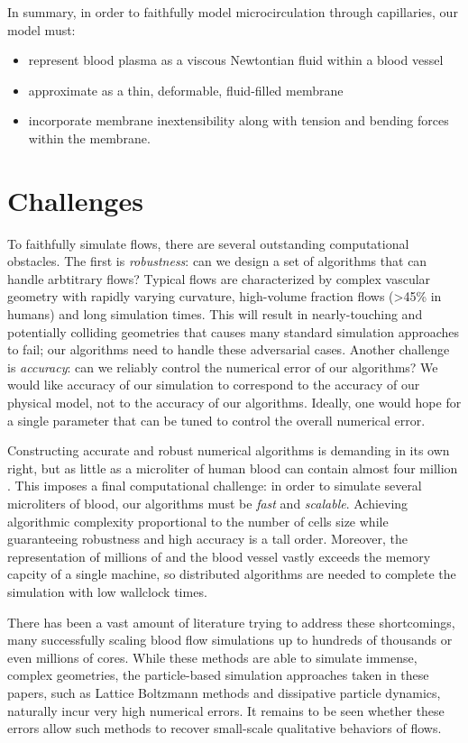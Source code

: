 In summary, in order to faithfully model microcirculation through capillaries, our model must:
\begin{itemize}
    \item represent blood plasma as a viscous Newtontian fluid within a blood vessel
    \item approximate \rbcs as a thin, deformable, fluid-filled membrane 
    \item incorporate \rbc membrane inextensibility along with tension and bending forces within the membrane.
\end{itemize}

\section{Challenges}
To faithfully simulate \rbc flows, there are several outstanding computational obstacles.
The first is \textit{robustness}: can we design a set of algorithms that can handle arbtitrary flows?
Typical flows are characterized by complex vascular geometry with rapidly varying curvature, high-volume fraction flows (>45\% in humans) and long simulation times. 
This will result in nearly-touching and potentially colliding geometries that causes many standard simulation approaches to fail; our algorithms need to handle these adversarial cases.
Another challenge is \textit{accuracy}: can we reliably control the numerical error of our algorithms?
We would like accuracy of our simulation to correspond to the accuracy of our physical model, not to the accuracy of our algorithms.
Ideally, one would hope for a single parameter that can be tuned to control the overall numerical error.

Constructing accurate and robust numerical algorithms is demanding in its own right, but as little as a microliter of human blood can contain almost four million \rbcs.
This imposes a final computational challenge: in order to simulate several microliters of blood, our algorithms must be \textit{fast} and \textit{scalable}.
Achieving algorithmic complexity proportional to the number of cells size while guaranteeing robustness and high accuracy is a tall order.
Moreover, the representation of millions of \rbcs and the blood vessel vastly exceeds the memory capcity of a single machine, so distributed algorithms are needed to complete the simulation with low wallclock times.

There has been a vast amount of literature trying to address these shortcomings, many successfully scaling blood flow simulations up to hundreds of thousands \cite{grinberg2011new,rossinelli2015silico} or even millions \cite{gounley2017computational,randles2015massively} of cores.
While these methods are able to simulate immense, complex geometries, the particle-based simulation approaches taken in these papers, such as Lattice Boltzmann methods and dissipative particle dynamics, naturally incur very high numerical errors.
It remains to be seen whether these errors allow such methods to recover small-scale qualitative behaviors of \rbc flows.

